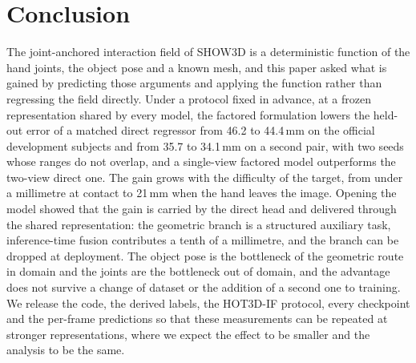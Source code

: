 \section{Conclusion}
\label{sec:conclusion}

The joint-anchored interaction field of SHOW3D is a deterministic function of the hand joints, the object pose and a known mesh, and this paper asked what is gained by predicting those arguments and applying the function rather than regressing the field directly. Under a protocol fixed in advance, at a frozen representation shared by every model, the factored formulation lowers the held-out error of a matched direct regressor from 46.2 to 44.4\,mm on the official development subjects and from 35.7 to 34.1\,mm on a second pair, with two seeds whose ranges do not overlap, and a single-view factored model outperforms the two-view direct one. The gain grows with the difficulty of the target, from under a millimetre at contact to 21\,mm when the hand leaves the image. Opening the model showed that the gain is carried by the direct head and delivered through the shared representation: the geometric branch is a structured auxiliary task, inference-time fusion contributes a tenth of a millimetre, and the branch can be dropped at deployment. The object pose is the bottleneck of the geometric route in domain and the joints are the bottleneck out of domain, and the advantage does not survive a change of dataset or the addition of a second one to training. We release the code, the derived labels, the HOT3D-IF protocol, every checkpoint and the per-frame predictions so that these measurements can be repeated at stronger representations, where we expect the effect to be smaller and the analysis to be the same.
